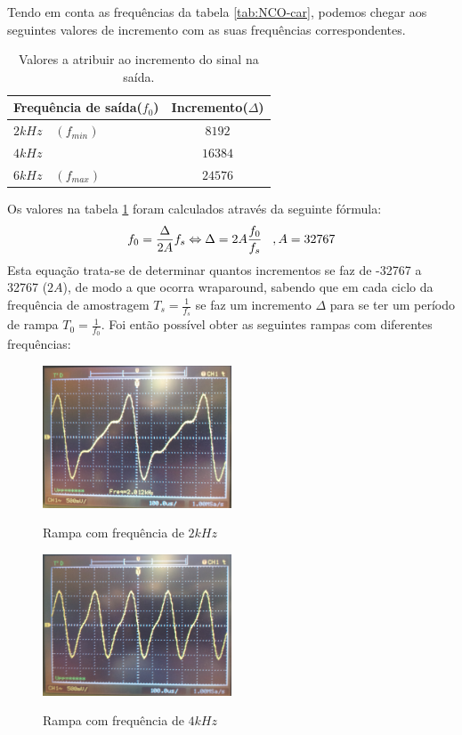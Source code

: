 \documentclass[11pt]{article}
\numberwithin{equation}{section}
\begin{document}
Tendo em conta as frequências da tabela \ref{tab:NCO-car}, podemos chegar aos seguintes valores de incremento com as suas frequências correspondentes.                      
\begin{table}[H]
	\centering
	\caption{Valores a atribuir ao incremento do sinal na saída.}
	\label{tab:incrementos}
	\begin{tabular}[c]{|l||c|}
		\hline \textbf{Frequência de saída($f_0$)} & \textbf{Incremento($\Delta$)}\\ 
		\hline $ 2 kHz \quad (f_{min}) $ & $ 8192 $\\ 
		\hline $ 4 kHz $ & $ 16384 $  \\ 
		\hline $ 6 kHz \quad (f_{max}) $ & $ 24576 $ \\ 
		\hline
	\end{tabular}
\end{table}

Os valores na tabela \ref{tab:incrementos} foram calculados através da seguinte fórmula:
\begin{equation}
 f_{0}= \frac{\Delta}{2A}f_{s} \Leftrightarrow \Delta= 2A\frac{f_{0}}{f_{s}} \hspace{3 mm}, A=32767
\end{equation}
Esta equação trata-se de determinar quantos incrementos se faz de -32767 a 32767 ($2A$), de modo a que ocorra wraparound, sabendo que em cada ciclo da frequência de amostragem $T_s=\frac{1}{f_s}$ se faz um incremento $\Delta$ para se ter um período de rampa $T_0=\frac{1}{f_0}$.
Foi então possível obter as seguintes rampas com diferentes frequências:
\begin{figure}[H]
	\centering
	\includegraphics[width=0.5\textwidth]{./P1_2kHz}~\\
	\caption{Rampa com frequência de $ 2 kHz $}
\end{figure}

\begin{figure}[H]
	\centering
	\includegraphics[width=0.5\textwidth]{./P1_4kHz}~\\
	\caption{Rampa com frequência de $ 4 kHz $}
\end{figure}
\end{document}

